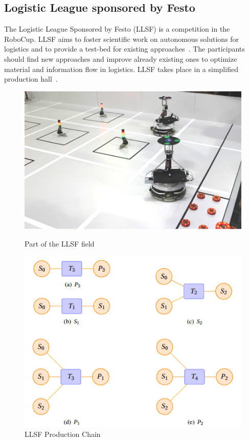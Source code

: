 \subsection{Logistic League sponsored by Festo}
The Logistic League Sponsored by Festo (LLSF) is a competition in the RoboCup. LLSF aims to foster scientific work on autonomous solutions for logistics and to provide a test-bed for existing approaches~\cite{LLSFTestbed}. The participants should find new approaches and improve already existing ones to optimize material and information flow in logistics.
LLSF takes place  in a simplified production hall~\cite{LLSFRules}.
\begin{figure}
\begin{minipage}[b]{0.5\linewidth}
\includegraphics[scale=0.23]{pics/llsf}
\caption{Part of the LLSF field}
\label{fig:llsf_field}
\end{minipage}
\quad
\begin{minipage}[b]{0.5\linewidth}
\includegraphics[scale=0.45]{pics/production_chain}
\caption{LLSF Production Chain~\cite{LLSFRules}}
\label{fig:llsf_chain}
\end{minipage}
\end{figure}
